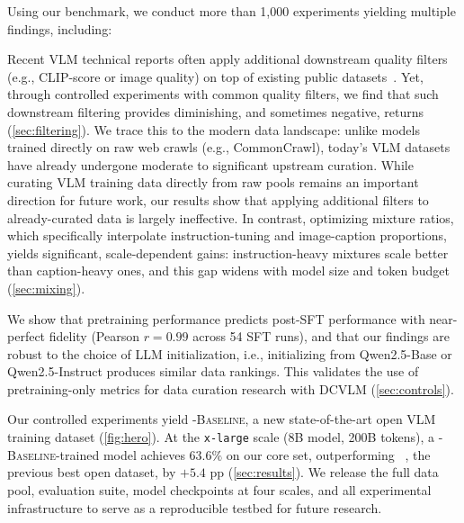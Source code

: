 Using our benchmark, we conduct more than 1,000 experiments yielding multiple findings, including:

Recent VLM technical reports often apply additional downstream quality filters (e.g., CLIP-score or image quality) on top of existing public datasets~\citep{zhang2026penguin,team2025kimi,yu2026minicpm}. Yet, through controlled experiments with common quality filters, we find that such downstream filtering provides diminishing, and sometimes negative, returns (\cref{sec:filtering}). We trace this to the modern data landscape: unlike models trained directly on raw web crawls (e.g., CommonCrawl), today's VLM datasets have already undergone moderate to significant upstream curation. While curating VLM training data directly from raw pools remains an important direction for future work, our results show that applying additional filters to already-curated data is largely ineffective. In contrast, optimizing mixture ratios, which specifically interpolate instruction-tuning and image-caption proportions, yields significant, scale-dependent gains: instruction-heavy mixtures scale better than caption-heavy ones, and this gap widens with model size and token budget (\cref{sec:mixing}).
 
We show that pretraining performance predicts post-SFT performance with near-perfect fidelity (Pearson $r = 0.99$ across 54 SFT runs), and that our findings are robust to the choice of LLM initialization, i.e., initializing from Qwen2.5-Base or Qwen2.5-Instruct \cite{qwen25}
produces similar data rankings.
This validates the use of pretraining-only metrics for data curation research with DCVLM (\cref{sec:controls}). 
 
Our controlled experiments yield \textsc{\dcvlm-Baseline}, a new state-of-the-art open VLM training dataset (\cref{fig:hero}). 
At the \texttt{x-large} scale (8B model, 200B tokens), a \textsc{\dcvlm-Baseline}-trained model achieves $63.6\%$ on our core set, outperforming \fv~\cite{wiedmann2025finevision}, the previous best open dataset, by ${+5.4}$ pp (\cref{sec:results}).
We release the full data pool, evaluation suite, model checkpoints at four scales, and all experimental infrastructure to serve as a reproducible testbed for future research.












